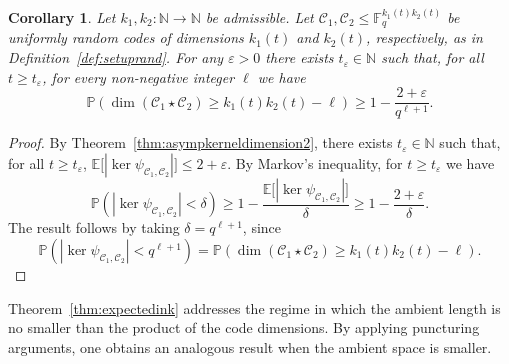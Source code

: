 \documentclass[a4paper,11pt,reqno]{article}
\newcommand{\F}{\mathbb{F}}
\newcommand{\C}{\mathcal{C}}
\theoremstyle{plain} \numberwithin{equation}{section}
\newtheorem{corollary}[theorem]{Corollary}
\theoremstyle{definition}
\begin{document}
\begin{corollary}
Let $k_1,k_2\colon \mathbb{N}\rightarrow \mathbb{N}$ be admissible. Let $\C_1, \C_2 \leq \F_q^{k_1(t)k_2(t)}$ be uniformly random codes of dimensions $k_1(t)$ and $k_2(t)$, respectively, as in Definition~\ref{def:setuprand}. For any $\varepsilon>0$ there exists $t_{\varepsilon}\in \mathbb{N}$ such that, for all $t\geq t_{\varepsilon}$, for every non-negative integer $\ell$ we have
\[
    \mathbb{P}\left(\dim (\C_1\star\C_2) \geq k_1(t)k_2(t) -\ell \right) \geq 1 - \frac{2+\varepsilon}{q^{\ell+1}}.
\]
\end{corollary}
\begin{proof}
By Theorem~\ref{thm:asympkerneldimension2}, there exists $t_{\varepsilon} \in \mathbb{N}$ such that, for all $t \geq t_{\varepsilon}$, $
    \mathbb{E}\big[|\ker\psi_{\C_1, \C_2}|\big] \leq 2 + \varepsilon.$
By Markov's inequality, for $t \geq t_{\varepsilon}$ we have
\[
    \mathbb{P}\left(|\ker\psi_{\C_1, \C_2}| < \delta \right) 
    \geq 1 - \frac{\mathbb{E}\big[|\ker\psi_{\C_1, \C_2}|\big]}{\delta}
    \geq 1 - \frac{2 + \varepsilon}{\delta}.
\]
The result follows by taking $\delta = q^{\ell + 1}$, since
\[
    \mathbb{P}\left(|\ker\psi_{\C_1, \C_2}| < q^{\ell + 1}\right)
    = \mathbb{P} \left(\dim(\C_1 \star \C_2) \geq k_1(t)k_2(t) - \ell\right). 
\]
\end{proof}

Theorem~\ref{thm:expectedink} addresses the regime in which the ambient length is no smaller than the product of the code dimensions. By applying puncturing arguments, one obtains an analogous result when the ambient space is smaller.
\end{document}
